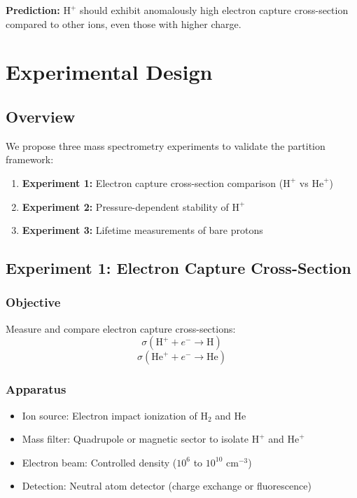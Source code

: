 \documentclass[12pt,a4paper]{article}
\begin{document}
\textbf{Prediction:} $\text{H}^+$ should exhibit anomalously high electron capture cross-section compared to other ions, even those with higher charge.

\section{Experimental Design}

\subsection{Overview}

We propose three mass spectrometry experiments to validate the partition framework:

\begin{enumerate}
\item \textbf{Experiment 1:} Electron capture cross-section comparison ($\text{H}^+$ vs $\text{He}^+$)
\item \textbf{Experiment 2:} Pressure-dependent stability of $\text{H}^+$
\item \textbf{Experiment 3:} Lifetime measurements of bare protons
\end{enumerate}

\subsection{Experiment 1: Electron Capture Cross-Section}

\subsubsection{Objective}

Measure and compare electron capture cross-sections:
$$
\sigma(\text{H}^+ + e^- \rightarrow \text{H})
$$
$$
\sigma(\text{He}^+ + e^- \rightarrow \text{He})
$$

\subsubsection{Apparatus}

\begin{itemize}
\item Ion source: Electron impact ionization of H$_2$ and He
\item Mass filter: Quadrupole or magnetic sector to isolate $\text{H}^+$ and $\text{He}^+$
\item Electron beam: Controlled density ($10^6$ to $10^{10}$ cm$^{-3}$)
\item Detection: Neutral atom detector (charge exchange or fluorescence)
\end{itemize}
\end{document}
